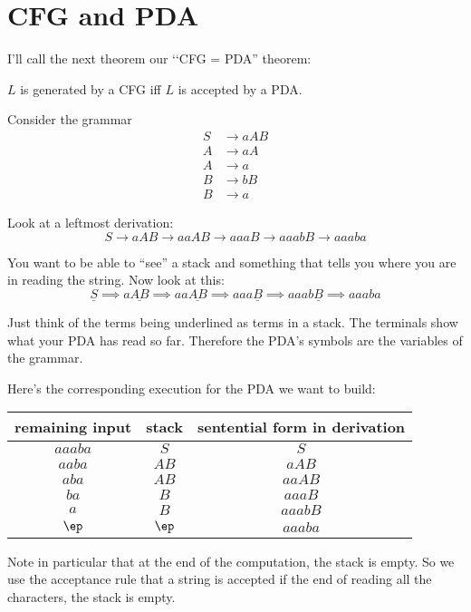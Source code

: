 \section{CFG and PDA}

I'll call the next theorem our \lq\lq CFG = PDA'' theorem:
\begin{thm}
 $L$ is generated by a CFG iff $L$ is accepted by a PDA.
\end{thm}

\begin{eg}
 Consider the grammar
 \begin{align*}
  S &\rightarrow aAB \\
  A &\rightarrow aA \\
  A &\rightarrow a \\
  B &\rightarrow bB \\
  B &\rightarrow a
 \end{align*}
\end{eg}

Look at a leftmost derivation:
\[
 S \rightarrow aAB \rightarrow aaAB \rightarrow aaaB \rightarrow
 aaabB \rightarrow aaaba
\]

You want to be able to ``see'' a stack and something that tells
you where you are in reading the string. Now look at this:
\[
\underline{S} 
\implies a\underline{AB} 
\implies aa\underline{AB} 
\implies aaa\underline{B} 
\implies aaab\underline{B}
\implies aaaba
\]

Just think of the terms being underlined as terms in a stack.
The terminals show what your PDA has read so far.
Therefore the PDA's symbols are the variables of the grammar.

Here's the corresponding execution for the PDA we want to build:
\begin{center}
\begin{tabular}{|c|c|c|} \hline
remaining input & stack & sentential form in derivation \\ \hline
$aaaba$ & $S$  & $S$ \\
$aaba$  & $AB$ & $aAB$ \\
$aba$   & $AB$ & $aaAB$ \\
$ba$    & $B$ & $aaaB$ \\
$a$     & $B$ & $aaabB$ \\
$\ep$   & $\ep$ & $aaaba$ \\ \hline
\end{tabular}
\end{center}

Note in particular that at the end of the computation, the stack is empty.
So we use the acceptance rule that a string is accepted if the end of reading 
all the characters, the stack is empty.

